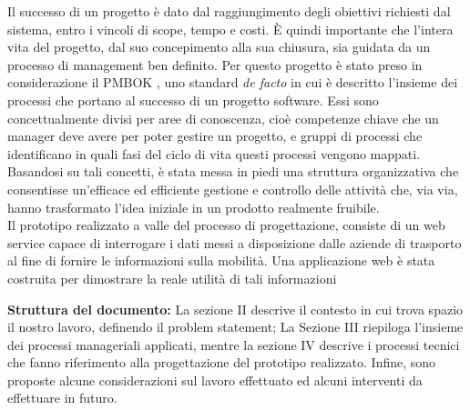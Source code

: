 Il successo di un progetto \`{e} dato dal raggiungimento degli obiettivi richiesti dal sistema, entro i vincoli di scope, tempo e costi. \`{E} quindi importante che l\rq intera vita del progetto, dal suo concepimento alla sua chiusura, sia guidata da un processo di management ben definito. Per questo progetto \`{e} stato preso in considerazione il PMBOK \cite{PMBOK}, uno standard \emph{de facto} in cui \`{e} descritto l\rq insieme dei processi che portano al successo di un progetto software. Essi sono concettualmente divisi per aree di conoscenza, cio\`{e} competenze chiave che un manager deve avere per poter gestire un progetto, e gruppi di processi che identificano in quali fasi del ciclo di vita questi processi vengono mappati.\\
Basandosi su tali concetti, \`{e} stata messa in piedi una struttura organizzativa che consentisse un\rq efficace ed efficiente gestione e controllo delle attivit\`{a} che, via via, hanno trasformato l\rq idea iniziale in un prodotto realmente fruibile.\\Il prototipo realizzato a valle del processo di progettazione, consiste di un web service capace di interrogare i dati messi a disposizione dalle aziende di trasporto al fine di fornire le informazioni sulla mobilit\`{a}. Una applicazione web \`{e} stata costruita per dimostrare la reale utilit\`{a} di tali informazioni

{\bf{Struttura del documento:}} La sezione II descrive il contesto in cui trova spazio il nostro lavoro, definendo il problem statement; La Sezione III riepiloga l\rq insieme dei processi manageriali applicati, mentre la sezione IV descrive i processi tecnici che fanno riferimento alla progettazione del prototipo realizzato. Infine, sono proposte alcune considerazioni sul lavoro effettuato ed alcuni interventi da effettuare in futuro. 